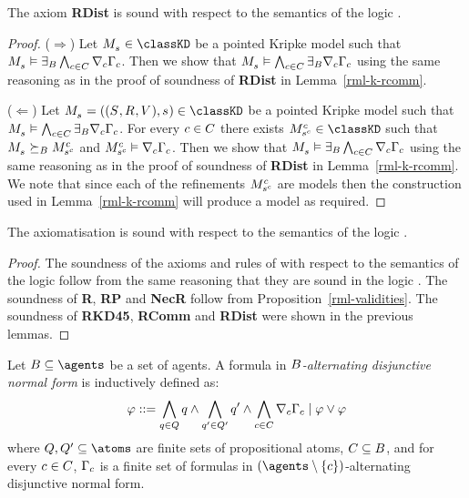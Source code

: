 \begin{lemma}
The axiom {\bf RDist} is sound with respect to the semantics of the logic \logicRmlKD{}.
\end{lemma}

\begin{proof}
($\Rightarrow$) Let $\kPModel{\kStateS} \in \classKD$ be a pointed Kripke model such that $\kPModel{\kStateS} \entails \somerefsBs \bigwedge_{\agentC \in \agentsC} \coversC \Gamma_\agentC$.
Then we show that $\kPModel{\kStateS} \entails \bigwedge_{\agentC \in \agentsC} \somerefsBs \coversC \Gamma_\agentC$ using the same reasoning as in the proof of soundness of {\bf RDist} in Lemma~\ref{rml-k-rcomm}.

($\Leftarrow$) Let $\kPModelAndTuple{\kStateS} \in \classKD$ be a pointed Kripke model such that $\kPModel{\kStateS} \entails \bigwedge_{\agentC \in \agentsC} \somerefsBs \coversC \Gamma_\agentC$.
For every $\agentC \in \agentsC$ there exists $\kPModel[\agentC]{\kStateS[\agentC]} \in \classKD$ such that $\kPModel{\kStateS} \simulatesBs \kPModel[\agentC]{\kStateS[\agentC]}$ and $\kPModel[\agentC]{\kStateS[\agentC]} \entails \coversC \Gamma_\agentC$.
Then we show that $\kPModel{\kStateS} \entails \somerefsBs \bigwedge_{\agentC \in \agentsC} \coversC \Gamma_\agentC$ using the same reasoning as in the proof of soundness of {\bf RDist} in Lemma~\ref{rml-k-rcomm}.
We note that since each of the refinements $\kPModel[\agentC]{\kStateS[\agentC]}$ are \classKD{} models then the construction used in Lemma~\ref{rml-k-rcomm} will produce a \classKD{} model as required.
\end{proof}

\begin{lemma}\label{rml-kd-sound}
The axiomatisation \axiomRmlKD{} is sound with respect to the semantics of the logic \logicRmlKD{}.
\end{lemma}

\begin{proof}
The soundness of the axioms and rules of \axiomKD{} with respect to the semantics of the logic \logicRmlKD{} follow from the same reasoning that they are sound in the logic \logicKD{}.
The soundness of {\bf R}, {\bf RP} and {\bf NecR} follow from Proposition~\ref{rml-validities}.
The soundness of {\bf RKD45}, {\bf RComm} and {\bf RDist} were shown in the previous lemmas.
\end{proof}

\begin{definition}
Let $\agentsB \subseteq \agents$ be a set of agents.
A formula in {\em $\agentsB$-alternating disjunctive normal form} is inductively defined as:
$$
\phi ::= \bigwedge_{\atomQ \in \atomsQ} \atomQ \land \bigwedge_{\atomQ' \in \atomsQ'} \atomQ' \land \bigwedge_{\agentC \in \agentsC} \coverC \Gamma_\agentC \mid \phi \lor \phi
$$
where $\atomsQ, \atomsQ' \subseteq \atoms$ are finite sets of propositional atoms, $\agentsC \subseteq \agentsB$, and for every $\agentC \in \agentsC$, $\Gamma_\agentC$ is a finite set of formulas in $(\agents \setminus \{\agentC\})$-alternating disjunctive normal form.
\end{definition}

